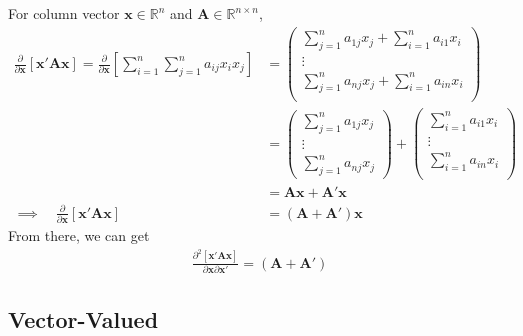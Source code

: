 \documentclass[12pt]{article}
\theoremstyle{plain}
\theoremstyle{definition}
\theoremstyle{remark}
\newcommand{\bsA}{\boldsymbol{A}}
\newcommand{\bsx}{\boldsymbol{x}}
\newcommand{\Rn}{\mathbb{R}^n}
\newcommand{\Rnn}{\mathbb{R}^{n\times n}}
\newcommand{\sumin}{\sum^n_{i=1}}
\newcommand{\sumjn}{\sum^n_{j=1}}
\begin{document}
For column vector $\bsx\in \Rn$ and $\bsA\in\Rnn$,
\begin{align*}
  \frac{\partial}{\partial \bsx}
  [\bsx'\bsA\bsx]
  =
  \frac{\partial}{\partial \bsx}
  \left[
    \sumin
    \sumjn
    a_{ij} x_i x_j
  \right]
  &=
  \begin{pmatrix}
    \sumjn a_{1j} x_j
    + \sumin a_{i1} x_i \\
    \vdots \\
    \sumjn a_{nj} x_j
    + \sumin a_{in} x_i \\
  \end{pmatrix}\\
  &=
  \begin{pmatrix}
    \sumjn a_{1j} x_j \\
    \vdots \\
    \sumjn a_{nj} x_j
  \end{pmatrix}
  +
  \begin{pmatrix}
    \sumin a_{i1} x_i \\
    \vdots \\
    \sumin a_{in} x_i \\
  \end{pmatrix}\\
  &= \bsA\bsx + \bsA'\bsx\\
  \implies\quad
  \frac{\partial}{\partial \bsx}
  [\bsx'\bsA\bsx]
  &= (\bsA+\bsA')\bsx
\end{align*}
From there, we can get
\begin{align*}
  \frac{\partial^2[\bsx'\bsA\bsx]}{\partial \bsx \partial \bsx'}
  =
  (\bsA + \bsA')
\end{align*}


\subsection{Vector-Valued}
\end{document}
